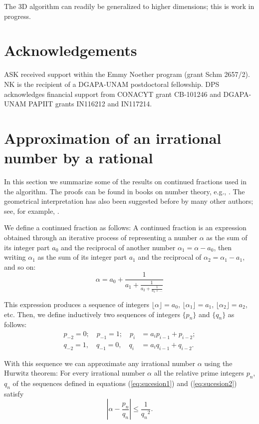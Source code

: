 \documentclass{iopart}
\newcommand{\eqref}[1]{(\ref{#1})}
\begin{document}
The 3D algorithm can readily be generalized to higher dimensions; this is work in progress. 

\section{Acknowledgements}  
ASK received support within the Emmy Noether program (grant Schm
2657/2). NK is the recipient of a DGAPA-UNAM postdoctoral fellowship. DPS acknowledges financial support from CONACYT grant CB-101246 and DGAPA-UNAM PAPIIT grants IN116212 and IN117214. 

\appendix
\section{Approximation of an irrational number by a rational}

In this section we summarize some of the results on continued fractions used in the algorithm. The proofs can be found in books on number theory, e.g., 
\cite{niven2008introduction}. The geometrical interpretation has also been suggested before by many other authors; see, for example, \cite{nogueira1995three}. 

We define a continued fraction as follows:
A continued fraction is an expression obtained through an iterative process of representing a number $\alpha$ as the sum of its integer part $a_0$ and the reciprocal of another number $\alpha_1=\alpha-a_0$, then writing $\alpha_1$ as the sum of its integer part $a_1$ and the reciprocal of $\alpha_2=\alpha_1-a_1$, and so on:
\begin{equation*}
  \alpha = a_0 + \frac{1}{\displaystyle a_1
          + \frac{1}{\displaystyle a_2
          + \frac{1}{\displaystyle a_3 + \dots}}}
\end{equation*}

This expression produces a sequence of integers $\lfloor \alpha \rfloor=a_0$, $\lfloor \alpha_1 \rfloor=a_1$, $\lfloor \alpha_2 \rfloor=a_2$, etc. 
Then, we define inductively two sequences of integers $\{ p_n\}$ and $\{ q_n\}$ as follows:
%
\begin{eqnarray}
p_{-2} = 0;  \quad p_{-1} = 1;  \quad p_i &=a_i p_{i-1}+p_{i-2};
\label{eq:sucesion1}
\\ 
q_{-2} = 1,  \quad q_{-1} = 0,  \quad q_i &=a_i q_{i-1}+q_{i-2}.
\label{eq:sucesion2}
\end{eqnarray}

With this sequence we can approximate any irrational number $\alpha$ using the Hurwitz theorem:
For every irrational number $\alpha$ all the relative prime integers $p_n$, $q_n$ of the sequences defined in equations \eqref{eq:sucesion1} and \eqref{eq:sucesion2} satisfy 
\begin{equation}
|\alpha- \frac{p_n}{q_n}|\leq  \frac{1}{{q_n}^2}.
\end{equation}



%


\end{document}
